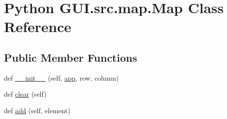 \hypertarget{class_python_01_g_u_i_1_1src_1_1map_1_1_map}{}\section{Python G\+U\+I.\+src.\+map.\+Map Class Reference}
\label{class_python_01_g_u_i_1_1src_1_1map_1_1_map}
\subsection*{Public Member Functions}
\begin{DoxyCompactItemize}
\item 
def \hyperlink{class_python_01_g_u_i_1_1src_1_1map_1_1_map_aead37e89075bd390f6aa26530917e692}{\+\_\+\+\_\+init\+\_\+\+\_\+} (self, \hyperlink{class_python_01_g_u_i_1_1src_1_1map_1_1_map_aa268f8584460f5b610910c82e6996121}{app}, row, column)
\item 
def \hyperlink{class_python_01_g_u_i_1_1src_1_1map_1_1_map_ac4f7448296c4d3104681bdb144e5befa}{clear} (self)
\item 
def \hyperlink{class_python_01_g_u_i_1_1src_1_1map_1_1_map_ae34c947dccc93eb838994545a5c0ba94}{add} (self, element)
\end{DoxyCompactItemize}

